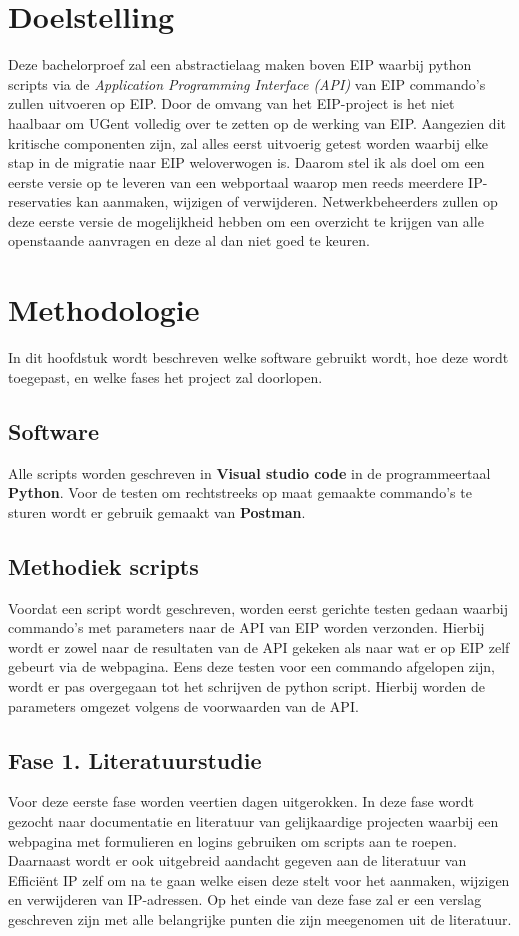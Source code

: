 \documentclass{hogent-article}
\begin{document}
\section{Doelstelling}
\label{sec:doelstelling}
Deze bachelorproef zal een abstractielaag maken boven EIP waarbij python scripts via de \textit{Application Programming Interface (API)} van EIP commando's zullen uitvoeren op EIP.
Door de omvang van het EIP-project is het niet haalbaar om UGent volledig over te zetten op de werking van EIP. Aangezien dit kritische componenten zijn, zal alles eerst uitvoerig getest worden waarbij elke stap in de migratie naar EIP weloverwogen is.
Daarom stel ik als doel om een eerste versie op te leveren van een webportaal waarop men reeds meerdere IP-reservaties kan aanmaken, wijzigen of verwijderen. Netwerkbeheerders zullen op deze eerste versie de mogelijkheid hebben om een overzicht te krijgen van alle openstaande aanvragen en deze al dan niet goed te keuren.

\section{Methodologie}
\label{sec:methodologie}
In dit hoofdstuk wordt beschreven welke software gebruikt wordt, hoe deze wordt toegepast, en welke fases het project zal doorlopen.

\subsection{Software}
Alle scripts worden geschreven in \textbf{Visual studio code} in de programmeertaal \textbf{Python}.
Voor de testen om rechtstreeks op maat gemaakte commando's te sturen wordt er gebruik gemaakt van \textbf{Postman}.

\subsection{Methodiek scripts}
Voordat een script wordt geschreven, worden eerst gerichte testen gedaan waarbij commando's met parameters naar de API van EIP worden verzonden. Hierbij wordt er zowel naar de resultaten van de API gekeken als naar wat er op EIP zelf gebeurt via de webpagina. Eens deze testen voor een commando afgelopen zijn, wordt er pas overgegaan tot het schrijven de python script. Hierbij worden de parameters omgezet volgens de voorwaarden van de API.

\subsection{Fase 1. Literatuurstudie}
Voor deze eerste fase worden veertien dagen uitgerokken. In deze fase wordt gezocht naar documentatie en literatuur van gelijkaardige projecten waarbij een webpagina met formulieren en logins gebruiken om scripts aan te roepen. Daarnaast wordt er ook uitgebreid aandacht gegeven aan de literatuur van Efficiënt IP zelf om na te gaan welke eisen deze stelt voor het aanmaken, wijzigen en verwijderen van IP-adressen.
Op het einde van deze fase zal er een verslag geschreven zijn met alle belangrijke punten die zijn meegenomen uit de literatuur.
\end{document}
